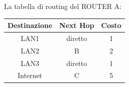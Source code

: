 \documentclass[a4paper]{article}
\begin{document}
\noindent
La tabella di routing del ROUTER A:

\begin{table}[H]
    \centering
    \begin{tabular}{c|c|c}
        \textbf{Destinazione} & \textbf{Next Hop} & \textbf{Costo} \\ \hline
        LAN1 & diretto  & 1 \\
        LAN2 & B & 2 \\
        LAN3 & diretto &1\\
        Internet & C & 5 \\
    \end{tabular}
\end{table}
\end{document}
